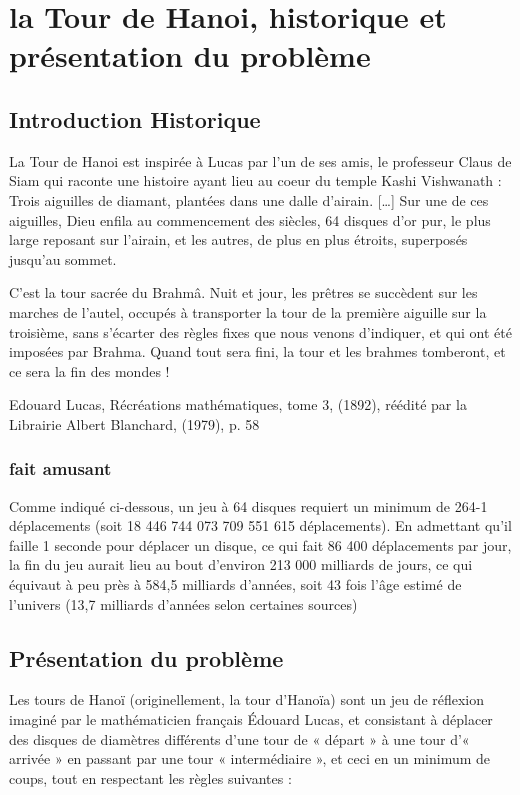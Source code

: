 \chapter{la Tour de Hanoi, historique et présentation du problème}

\section{Introduction Historique}
La Tour de Hanoi est inspirée à Lucas par l’un de ses amis, le professeur Claus de Siam qui raconte une histoire ayant lieu au coeur du temple Kashi Vishwanath :
Trois aiguilles de diamant, plantées dans une dalle d’airain. […] Sur une de ces aiguilles, Dieu enfila au commencement des siècles, 64 disques d’or pur, le plus large reposant sur l’airain, et les autres, de plus en plus étroits, superposés jusqu’au sommet.

C’est la tour sacrée du Brahmâ. Nuit et jour, les prêtres se succèdent sur les marches de l’autel, occupés à transporter la tour de la première aiguille sur la troisième, sans s’écarter des règles fixes que nous venons d’indiquer, et qui ont été imposées par Brahma. Quand tout sera fini, la tour et les brahmes tomberont, et ce sera la fin des mondes !

Edouard Lucas, Récréations mathématiques, tome 3, (1892), réédité par la Librairie Albert Blanchard, (1979), p. 58
\subsection{fait amusant}
Comme indiqué ci-dessous, un jeu à 64 disques requiert un minimum de 264-1 déplacements (soit 18 446 744 073 709 551 615 déplacements). En admettant qu'il faille 1 seconde pour déplacer un disque, ce qui fait 86 400 déplacements par jour, la fin du jeu aurait lieu au bout d'environ 213 000 milliards de jours, ce qui équivaut à peu près à 584,5 milliards d'années, soit 43 fois l'âge estimé de l'univers (13,7 milliards d'années selon certaines sources)

\section{Présentation du problème}
Les tours de Hanoï (originellement, la tour d'Hanoïa) sont un jeu de réflexion imaginé par le mathématicien français Édouard Lucas, et consistant à déplacer des disques de diamètres différents d'une tour de « départ » à une tour d'« arrivée » en passant par une tour « intermédiaire », et ceci en un minimum de coups, tout en respectant les règles suivantes :

